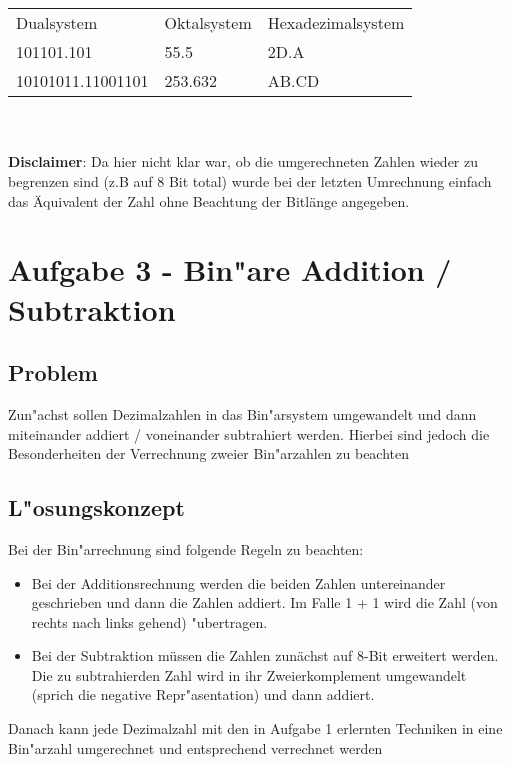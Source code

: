 \documentclass[a4paper,11pt,titlepage]{article}
\begin{document}
    \\ \\

    \begin{table}[h]
        \centering
        \begin{tabular}{lll}
            Dualsystem        & Oktalsystem & Hexadezimalsystem \\
            101101.101        & 55.5        & 2D.A              \\
            10101011.11001101 & 253.632     & AB.CD             \\
        \end{tabular}\label{tab:table}
    \end{table}
    \\ \\

    \noindent \textbf{Disclaimer}: Da hier nicht klar war, ob die umgerechneten Zahlen wieder zu begrenzen sind (z.B auf 8 Bit total) wurde bei der letzten Umrechnung einfach das Äquivalent der Zahl ohne Beachtung der Bitlänge angegeben.


    \section{Aufgabe 3 - Bin"are Addition / Subtraktion}

    \subsection{Problem}
    Zun"achst sollen Dezimalzahlen in das Bin"arsystem umgewandelt und dann miteinander addiert / voneinander subtrahiert werden. Hierbei sind jedoch die Besonderheiten der Verrechnung zweier Bin"arzahlen zu beachten

    \subsection{L"osungskonzept}
    Bei der Bin"arrechnung sind folgende Regeln zu beachten:
    \begin{itemize}
        \item Bei der Additionsrechnung werden die beiden Zahlen untereinander geschrieben und dann die Zahlen addiert. Im Falle 1 + 1 wird die Zahl (von rechts nach links gehend) "ubertragen.
        \item Bei der Subtraktion müssen die Zahlen zunächst auf 8-Bit erweitert werden. Die zu subtrahierden Zahl wird in ihr Zweierkomplement umgewandelt (sprich die negative Repr"asentation) und dann addiert.
    \end{itemize}
    Danach kann jede Dezimalzahl mit den in Aufgabe 1 erlernten Techniken in eine Bin"arzahl umgerechnet und entsprechend verrechnet werden
\end{document}
